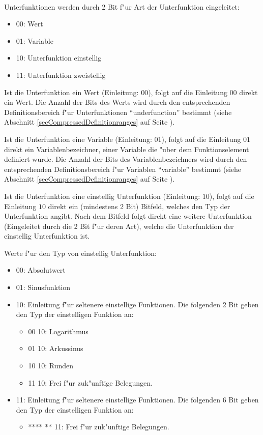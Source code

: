 \ \\
Unterfunktionen werden durch 2 Bit f"ur Art der Unterfunktion eingeleitet:
\begin{itemize}
 \item 00: Wert
 \item 01: Variable
 \item 10: Unterfunktion einstellig
 \item 11: Unterfunktion zweistellig
\end{itemize}

Ist die Unterfunktion ein Wert (Einleitung: $00$), folgt auf die Einleitung $00$ direkt ein Wert. Die Anzahl der Bits des Werts wird durch den entsprechenden Definitionsbereich f"ur Unterfunktionen ``underfunction'' bestimmt (siehe Abschnitt \ref{secCompressedDefinitionranges} auf Seite \pageref{secCompressedDefinitionranges}).

Ist die Unterfunktion eine Variable (Einleitung: $01$), folgt auf die Einleitung $01$ direkt ein Variablenbezeichner, einer Variable die "uber dem Funktionselement definiert wurde. Die Anzahl der Bits des Variablenbezeichners wird durch den entsprechenden Definitionsbereich f"ur Variablen ``variable'' bestimmt (siehe Abschnitt \ref{secCompressedDefinitionranges} auf Seite \pageref{secCompressedDefinitionranges}).

\bigskip\noindent
Ist die Unterfunktion eine einstellig Unterfunktion (Einleitung: $10$), folgt auf die Einleitung $10$ direkt ein (mindestens 2 Bit) Bitfeld, welches den Typ der Unterfunktion angibt. Nach dem Bitfeld folgt direkt eine weitere Unterfunktion (Eingeleitet durch die 2 Bit f"ur deren Art), welche die Unterfunktion der einstellig Unterfunktion ist.

\bigskip\noindent
Werte f"ur den Typ von einstellig Unterfunktion:
\begin{itemize}
 \item 00: Absolutwert
 \item 01: Sinusfunktion
 \item 10: Einleitung f"ur seltenere einstellige Funktionen. Die folgenden 2 Bit geben den Typ der einstelligen Funktion an:
 \begin{itemize}
  \item 00 10: Logarithmus
  \item 01 10: Arkussinus
  \item 10 10: Runden
  \item 11 10: Frei f"ur zuk"unftige Belegungen.
 \end{itemize}
 \item 11: Einleitung f"ur seltenere einstellige Funktionen. Die folgenden 6 Bit geben den Typ der einstelligen Funktion an:
 \begin{itemize}
  \item **** ** 11: Frei f"ur zuk"unftige Belegungen.
 \end{itemize}
\end{itemize}


